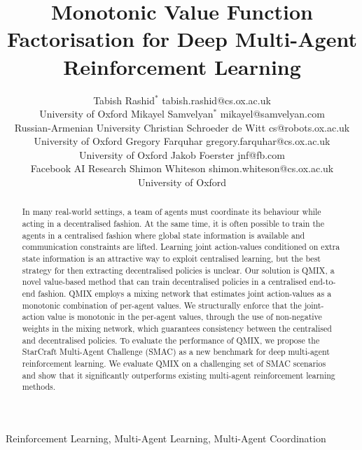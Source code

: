 \documentclass[twoside,11pt]{article}
\begin{document}
\title{Monotonic Value Function Factorisation for Deep Multi-Agent Reinforcement Learning}

\author{\name Tabish Rashid$^*$ \email tabish.rashid@cs.ox.ac.uk \\
       \addr University of Oxford
       \AND
       \name Mikayel Samvelyan$^*$ \email mikayel@samvelyan.com \\
       \addr Russian-Armenian University
       \AND
       \name Christian Schroeder de Witt \email cs@robots.ox.ac.uk \\
       \addr University of Oxford
       \AND
       \name Gregory Farquhar \email gregory.farquhar@cs.ox.ac.uk \\
       \addr University of Oxford
        \AND
       \name Jakob Foerster \email jnf@fb.com\\
       \addr Facebook AI Research
        \AND
       \name Shimon Whiteson \email shimon.whiteson@cs.ox.ac.uk \\
       \addr University of Oxford
   }

\newcommand{\customfootnotetext}[2]{{\renewcommand{\thefootnote}{#1}\footnotetext[0]{#2}}}

\customfootnotetext{$^*$}{Equal contribution.}


\maketitle
\begin{abstract}
\label{sec:abstract}

In many real-world settings, a team of agents must coordinate its behaviour  
while acting in a decentralised fashion. At the same time, it is often possible to 
train the agents in a centralised fashion
where global state information is available and communication constraints are lifted. 
Learning joint action-values conditioned on extra state information is 
an attractive way to exploit centralised learning, but the best strategy for 
then extracting decentralised policies is unclear.
Our solution is QMIX, a novel value-based method that can train decentralised policies in a centralised end-to-end fashion. 
QMIX employs a mixing network that estimates joint action-values as a monotonic combination of per-agent values.
We structurally enforce that the joint-action value is monotonic in the 
per-agent values, through the use of non-negative weights in the mixing network, which 
guarantees consistency between the 
centralised and decentralised policies.
To evaluate the performance of QMIX, we propose the StarCraft Multi-Agent Challenge (SMAC) as a new benchmark for deep multi-agent reinforcement learning.
We evaluate QMIX on a challenging set of SMAC scenarios and show that it significantly outperforms existing multi-agent reinforcement learning methods.

\end{abstract} 
\begin{keywords}
  Reinforcement Learning, Multi-Agent Learning, Multi-Agent Coordination
\end{keywords}
\end{document}
